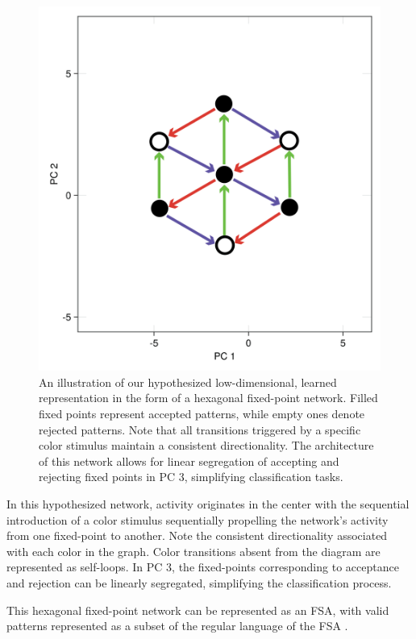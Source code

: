\documentclass[conference]{IEEEtran}
\begin{document}
\begin{figure}[htbp]
\centerline{\includegraphics[scale=0.125]{hypothesis.png}}
\caption{An illustration of our hypothesized low-dimensional, learned representation in the form of a hexagonal fixed-point network. Filled fixed points represent accepted patterns, while empty ones denote rejected patterns. Note that all transitions triggered by a specific color stimulus maintain a consistent directionality. The architecture of this network allows for linear segregation of accepting and rejecting fixed points in PC 3, simplifying classification tasks.}
\label{hypothesisFSA}
\end{figure}

In this hypothesized network, activity originates in the center with the sequential introduction of a color stimulus sequentially propelling the network's activity from one fixed-point to another. Note the consistent directionality associated with each color in the graph. Color transitions absent from the diagram are represented as self-loops. In PC 3, the fixed-points corresponding to acceptance and rejection can be linearly segregated, simplifying the classification process.

This hexagonal fixed-point network can be represented as an FSA, with valid patterns represented as a subset of the regular language of the FSA \cite{tivno1998finite}.
\end{document}
